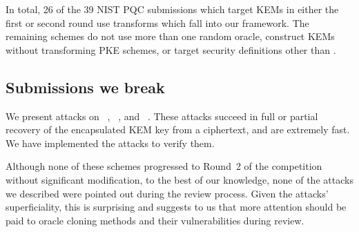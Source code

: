In total, 26 of the 39 NIST PQC submissions which target KEMs in either the first or second round use transforms which fall into our framework. The remaining schemes do not use more than one random oracle, construct KEMs without transforming PKE schemes, or target security definitions other than \INDCCA. 

%

\subsection{Submissions we break}

We present attacks on ~\cite{nistpqc:BIGQUAKE}, ~\cite{nistpqc:DAGS}, and ~\cite{nistpqc:Round2}. These attacks succeed in full or partial recovery of the encapsulated KEM key from a ciphertext, and are extremely fast. We have implemented the attacks to verify them.

Although none of these schemes progressed to Round~2 of the competition without significant modification, to the best of our knowledge, none of the attacks we described were pointed out during the review process. Given the attacks' superficiality, this is surprising and suggests to us that more attention should be paid to oracle cloning methods and their vulnerabilities during review. 

